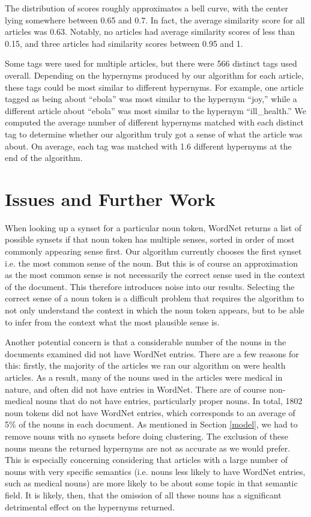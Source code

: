 \documentclass[12pt]{article}
\begin{document}
The distribution of scores roughly approximates a bell curve, with the center lying somewhere between 0.65 and 0.7. In fact, the average similarity score for all articles was 0.63. Notably, no articles had average similarity scores of less than 0.15, and three articles had similarity scores between 0.95 and 1.

Some tags were used for multiple articles, but there were 566 distinct tags used overall. Depending on the hypernyms produced by our algorithm for each article, these tags could be most similar to different hypernyms. For example, one article tagged as being about ``ebola'' was most similar to the hypernym ``joy,'' while a different article about ``ebola'' was most similar to the hypernym ``ill\_health.'' We computed the average number of different hypernyms matched with each distinct tag to determine whether our algorithm truly got a sense of what the article was about. On average, each tag was matched with 1.6 different hypernyms at the end of the algorithm.

\section{Issues and Further Work}

When looking up a synset for a particular noun token, WordNet returns a list of possible synsets if that noun token has multiple senses, sorted in order of most commonly appearing sense first. Our algorithm currently chooses the first synset i.e. the most common sense of the noun. But this is of course an approximation as the most common sense is not necessarily the correct sense used in the context of the document. This therefore introduces noise into our results. Selecting the correct sense of a noun token is a difficult problem that requires the algorithm to not only understand the context in which the noun token appears, but to be able to infer from the context what the most plausible sense is.

Another potential concern is that a considerable number of the nouns in the documents examined did not have WordNet entries. There are a few reasons for this: firstly, the majority of the articles we ran our algorithm on were health articles. As a result, many of the nouns used in the articles were medical in nature, and often did not have entries in WordNet. There are of course non-medical nouns that do not have entries, particularly proper nouns. In total, 1802 noun tokens did not have WordNet entries, which corresponds to an average of 5\% of the nouns in each document. As mentioned in Section \ref{model}, we had to remove nouns with no synsets before doing clustering. The exclusion of these nouns means the returned hypernyms are not as accurate as we would prefer. This is especially concerning considering that articles with a large number of nouns with very specific semantics (i.e. nouns less likely to have WordNet entries, such as medical nouns) are more likely to be about some topic in that semantic field. It is likely, then, that the omission of all these nouns has a significant detrimental effect on the hypernyms returned.
\end{document}
